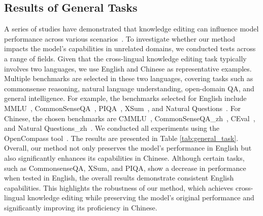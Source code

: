 \subsection{Results of General Tasks} 
A series of studies have demonstrated that knowledge editing can influence model performance across various scenarios~\cite{yang2024butterfly,li2023unveiling,gu2024model}. To investigate whether our method impacts the model's capabilities in unrelated domains, we conducted tests across a range of fields.
Given that the cross-lingual knowledge editing task typically involves two languages, we use English and Chinese as representative examples. Multiple benchmarks are selected in these two languages, covering tasks such as commonsense reasoning, natural language understanding, open-domain QA, and general intelligence.
For example, the benchmarks selected for English include MMLU~\cite{hendrycks2020measuring}, CommonSenseQA~\cite{talmor2018commonsenseqa}, PIQA~\cite{bisk2020piqa}, XSum~\cite{narayan2018don}, and Natural Questions~\cite{kwiatkowski2019natural}. For Chinese, the chosen benchmarks are CMMLU~\cite{li2023cmmlu}, CommonSenseQA\_zh~\cite{2023opencompass}, CEval~\cite{huang2024c}, and Natural Questions\_zh~\cite{2023opencompass}.
We conducted all experiments using the OpenCompass tool~\cite{2023opencompass}.
The results are presented in Table \ref{tab:general_task}. 
Overall, our method not only preserves the model's performance in English but also significantly enhances its capabilities in Chinese.
Although certain tasks, such as CommonsenseQA, XSum, and PIQA, show a decrease in performance when tested in English, the overall results demonstrate consistent English capabilities. This highlights the robustness of our method, which achieves cross-lingual knowledge editing while preserving the model's original performance and significantly improving its proficiency in Chinese.